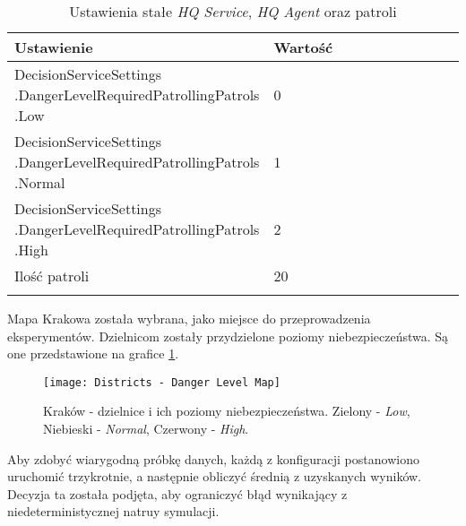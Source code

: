\begin{longtable}{|p{0.5\linewidth} | p{0.5\linewidth}|} 
    \hline
    Ustawienie & Wartość \\
    \hline
    \hline
    \makecell[tl]{DecisionServiceSettings\\.DangerLevelRequiredPatrollingPatrols\\.Low} & 0 \\
    \hline
    \makecell[tl]{DecisionServiceSettings\\.DangerLevelRequiredPatrollingPatrols\\.Normal} & 1 \\
    \hline
    \makecell[tl]{DecisionServiceSettings\\.DangerLevelRequiredPatrollingPatrols\\.High} & 2 \\
    \hline
    Ilość patroli & 20 \\
    \hline
\caption{Ustawienia stałe \emph{HQ Service}, \emph{HQ Agent} oraz patroli}
\label{tab:ustawieniaHqService}
\end{longtable}

\par Mapa Krakowa została wybrana, jako miejsce do przeprowadzenia eksperymentów. Dzielnicom zostały przydzielone poziomy niebezpieczeństwa. Są one przedstawione na grafice \ref{fig:districtDangerLevelMap}.

\begin{figure}
    \centering
    \texttt{[image: Districts - Danger Level Map]}
    \caption{Kraków - dzielnice i ich poziomy niebezpieczeństwa. Zielony - \emph{Low}, Niebieski - \emph{Normal}, Czerwony - \emph{High}.}
    \label{fig:districtDangerLevelMap}
\end{figure}

\par Aby zdobyć wiarygodną próbkę danych, każdą z konfiguracji postanowiono uruchomić trzykrotnie, a następnie obliczyć średnią z uzyskanych wyników. Decyzja ta została podjęta, aby ograniczyć błąd wynikający z niedeterministycznej natruy symulacji.